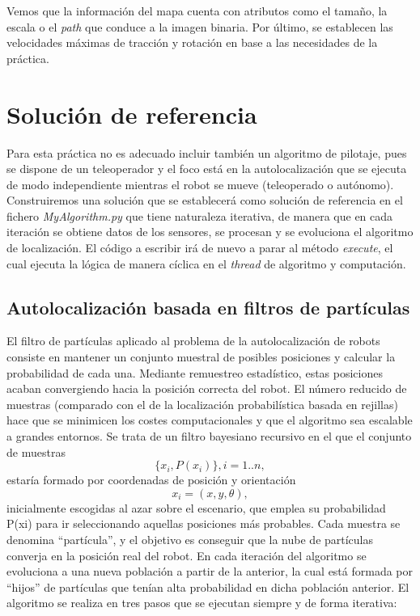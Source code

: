 Vemos que la información del mapa cuenta con atributos como el tamaño, la escala o el \textit{path} que conduce a la imagen binaria. Por último, se establecen las velocidades máximas de tracción y rotación en base a las necesidades de la práctica. 

\section{Solución de referencia}
Para esta práctica no es adecuado incluir también un algoritmo de pilotaje, pues se dispone de un teleoperador y el foco está en la autolocalización que se ejecuta de modo independiente mientras el robot se mueve (teleoperado o autónomo). Construiremos una solución que se establecerá como solución de referencia en el fichero \textit{MyAlgorithm.py} que tiene naturaleza iterativa, de manera que en cada iteración se obtiene datos de los sensores, se procesan y se evoluciona el algoritmo de localización. El código a escribir irá de nuevo a parar al método \textit{execute}, el cual ejecuta la lógica de manera cíclica en el \textit{thread} de algoritmo y computación.

\subsection{Autolocalización basada en filtros de partículas}
El filtro de partículas aplicado al problema de la autolocalización de robots consiste en mantener un conjunto muestral de posibles posiciones y calcular la probabilidad de cada una. Mediante remuestreo estadístico, estas posiciones acaban convergiendo hacia la posición correcta del robot. El número reducido de muestras (comparado con el de la localización probabilística basada en rejillas) hace que se minimicen los costes computacionales y que el algoritmo sea escalable a grandes entornos. Se trata de un filtro bayesiano recursivo en el que el conjunto de muestras
\begin{equation}
\{x_{i},P(x_{i})\}, i = 1..n,
\end{equation} estaría formado por coordenadas de posición y orientación
\begin{equation}
x_{i} = (x, y, \theta),
\end{equation} inicialmente escogidas al azar sobre el escenario, que emplea su probabilidad P(xi) para ir seleccionando aquellas posiciones más probables. Cada muestra se denomina “partícula”, y el objetivo es conseguir que la nube de partículas converja en la posición real del robot. En cada iteración del algoritmo se evoluciona a una nueva población a partir de la anterior, la cual está formada por “hijos” de partículas que tenían alta probabilidad en dicha población anterior. El algoritmo se realiza en tres pasos que se ejecutan siempre y de forma iterativa:

